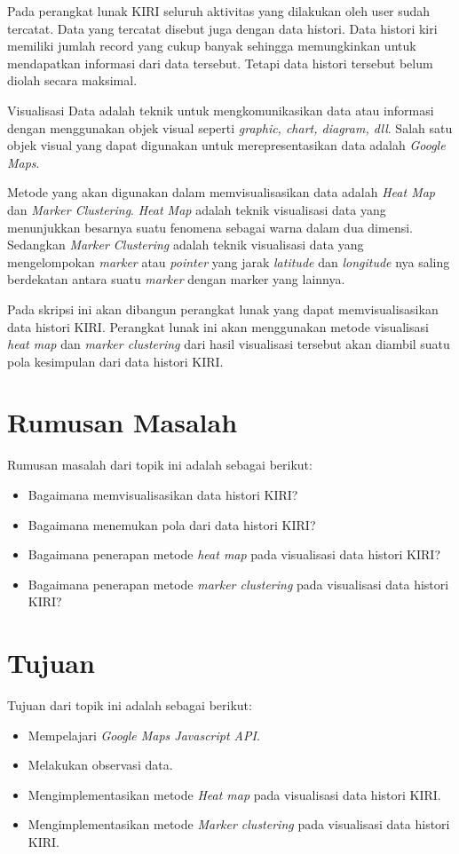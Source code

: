 Pada perangkat lunak KIRI seluruh aktivitas yang dilakukan oleh user sudah tercatat. Data yang tercatat disebut juga dengan data histori. Data histori kiri memiliki jumlah record yang cukup banyak sehingga memungkinkan untuk mendapatkan informasi dari data tersebut. Tetapi data histori tersebut belum diolah secara maksimal.

Visualisasi Data adalah teknik  untuk mengkomunikasikan data atau informasi dengan menggunakan objek visual  seperti \textit{graphic, chart, diagram, dll}. Salah satu objek visual yang dapat digunakan untuk merepresentasikan data adalah \textit{Google Maps}.

Metode yang akan digunakan dalam memvisualisasikan data adalah \textit{Heat Map} dan \textit{Marker Clustering}. \textit{Heat Map} adalah teknik visualisasi data yang menunjukkan besarnya suatu fenomena sebagai warna dalam dua dimensi. Sedangkan \textit{Marker Clustering}  adalah teknik visualisasi data  yang  mengelompokan \textit{marker} atau \textit{pointer} yang jarak \textit{latitude} dan \textit{longitude} nya saling berdekatan antara suatu \textit{marker} dengan marker yang lainnya.

Pada skripsi ini akan dibangun perangkat lunak yang dapat memvisualisasikan data histori KIRI. Perangkat lunak ini akan menggunakan metode visualisasi \textit{heat map} dan \textit{marker clustering} dari hasil visualisasi tersebut akan diambil suatu pola kesimpulan dari data histori KIRI.


\section{Rumusan Masalah}
\label{sec:rumusan}
Rumusan masalah dari topik ini adalah sebagai berikut:
\begin{itemize}
  \item Bagaimana memvisualisasikan data histori KIRI?
  \item Bagaimana menemukan pola dari data histori KIRI?
  \item Bagaimana penerapan metode \textit{heat map} pada visualisasi data histori KIRI?
  \item Bagaimana penerapan metode \textit{marker clustering} pada visualisasi data histori KIRI?


\end{itemize}

\section{Tujuan}
\label{sec:tujuan}
Tujuan dari topik ini adalah sebagai berikut:
\begin{itemize}
  \item Mempelajari \textit{Google Maps Javascript API}.
  \item Melakukan observasi data.
  \item Mengimplementasikan metode \textit{Heat map} pada visualisasi data histori KIRI.
  \item Mengimplementasikan metode \textit{Marker clustering} pada visualisasi data histori KIRI.


\end{itemize}

